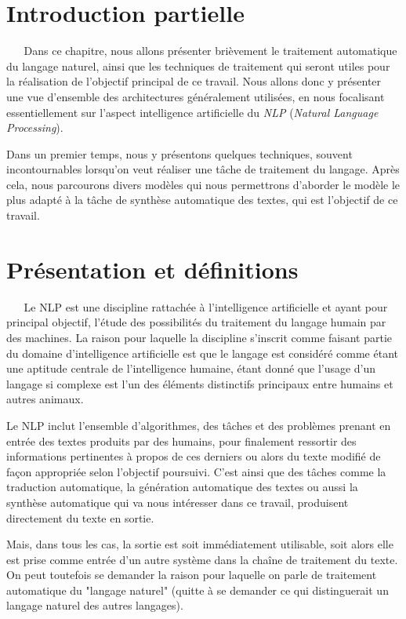 \section{Introduction partielle}
$ _{} $ $ _{} $ $ _{} $ $ _{} $ $ _{} $Dans ce chapitre, nous allons présenter brièvement le traitement automatique du langage naturel, ainsi que les techniques de traitement qui seront utiles pour la réalisation de l'objectif principal de ce travail. Nous allons donc y présenter une vue d'ensemble des architectures généralement utilisées, en nous focalisant essentiellement sur l'aspect intel\-li\-gence artificielle du \textit{NLP} (\textit{Natural Language Processing}).

Dans un premier temps, nous y présentons quelques techniques, souvent in\-con\-tour\-nables lorsqu'on veut réaliser une tâche de traitement du langage. Après cela, nous parcourons divers modèles qui nous permettrons d'aborder le modèle le plus adapté à la tâche de synthèse automatique des textes, qui est l'objectif de ce travail.
\section{Présentation et définitions}
$ _{} $ $ _{} $ $ _{} $ $ _{} $ $ _{} $Le NLP est une discipline rattachée à l'intelligence artificielle et ayant pour principal objectif, l'étude des possibilités du traitement du langage humain par des machines. La raison pour laquelle la discipline s'inscrit comme faisant partie du domaine d'intelligence artificielle est que le langage est considéré comme étant une aptitude centrale de l'intelligence humaine, étant donné que l'usage d'un langage si com\-ple\-xe est l'un des éléments distinctifs principaux entre humains et autres animaux.

Le NLP inclut l'ensemble d'algorithmes, des tâches et des problèmes prenant en entrée des textes produits par des humains, pour finalement ressortir des informations pertinentes à propos de ces derniers ou alors du texte modifié de façon appropriée selon l'objectif poursuivi. C'est ainsi que des tâches comme la traduction automatique, la génération automatique des textes ou aussi la synthèse automatique qui va nous intéresser dans ce travail, produisent directement du texte en sortie.

Mais, dans tous les cas, la sortie est soit immédiatement utilisable, soit alors elle est prise comme entrée d'un autre système dans la chaîne de traitement du texte.\\
On peut toutefois se demander la raison pour laquelle on parle de traitement automatique du "langage naturel" (quitte à se demander ce qui distinguerait un langage naturel des autres langages).

